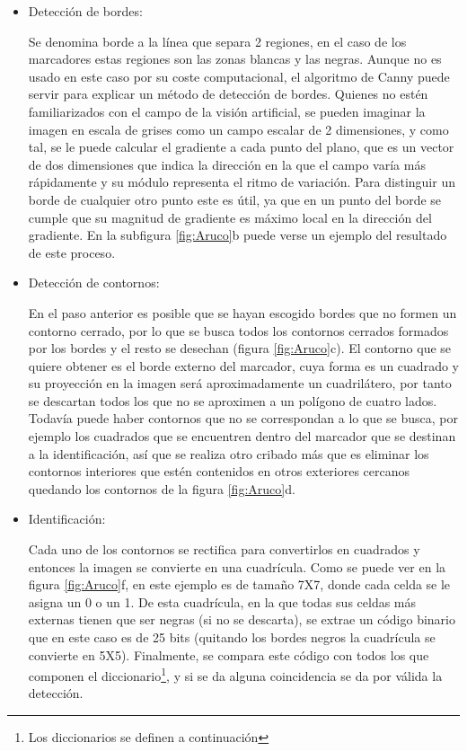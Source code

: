 \begin{itemize}
\item Detección de bordes: 

	Se denomina borde a la línea que separa 2 regiones, en el caso de los marcadores estas regiones son las zonas blancas y las negras. Aunque no es usado  en este caso por su coste computacional, el algoritmo de Canny puede servir para explicar un método de detección de bordes. 
	Quienes no estén familiarizados con el campo de la visión artificial, se pueden imaginar la imagen en escala de grises como un campo escalar de 2 dimensiones, y como tal, se le puede calcular el gradiente a cada punto del plano, que es un vector de dos dimensiones que indica la dirección en la que el campo varía más rápidamente y su módulo representa el ritmo de variación. Para distinguir un borde de cualquier otro punto este es útil, ya que en un punto del borde se cumple que su magnitud de gradiente es máximo local en la dirección del gradiente. En la subfigura \ref{fig:Aruco}{b} puede verse un ejemplo del resultado de este proceso.

\item Detección de contornos:

	En el paso anterior es posible que se hayan escogido bordes que no formen un contorno cerrado, por lo que se busca todos los contornos cerrados formados por los bordes y el resto se desechan (figura \mbox{\ref{fig:Aruco}c}). 
	El contorno que se quiere obtener es el borde externo del marcador, cuya forma es un cuadrado y su proyección en la imagen será aproximadamente un cuadrilátero, por tanto se descartan todos los que no se aproximen a un polígono de cuatro lados. Todavía puede haber contornos que no se correspondan a lo que se busca, por ejemplo los cuadrados que se encuentren dentro del marcador que se destinan a la identificación, así que se realiza otro cribado más que es eliminar los contornos interiores que estén contenidos en otros exteriores cercanos quedando los contornos de la figura \mbox{\ref{fig:Aruco}d}. 
	
\item Identificación: 

	Cada uno de los contornos se rectifica para convertirlos en cuadrados y entonces la imagen se convierte en una cuadrícula. Como se puede ver en la figura \ref{fig:Aruco}{f}, en este ejemplo es de tamaño 7X7, donde cada celda se le asigna un 0 o un 1. De esta cuadrícula, en la que todas sus celdas más externas tienen que ser negras (si no se descarta), se extrae un código binario que en este caso es de 25 bits (quitando los bordes negros la cuadrícula se convierte en 5X5). Finalmente, se compara este código con todos los que componen el diccionario\footnote{Los diccionarios se definen a continuación}, y si se da alguna coincidencia se da por válida la detección.   
\end{itemize}

